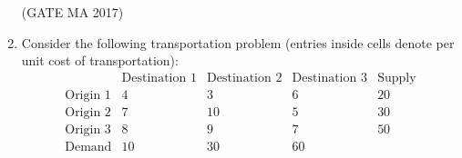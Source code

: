 \documentclass[journal,12pt,onecolumn]{IEEEtran}
\theoremstyle{remark}
\begin{document}
\begin{enumerate}
\begin{enumerate}
\end{enumerate}
\hfill (GATE MA 2017)
\item
Consider the following transportation problem (entries inside cells denote per unit cost of transportation):
$$
\begin{array}{c|ccc|c}
     & \text{Destination 1} & \text{Destination 2} & \text{Destination 3} & \text{Supply} \\
\hline
\text{Origin 1} & 4 & 3 & 6 & 20 \\
\text{Origin 2} & 7 & 10 & 5 & 30 \\
\text{Origin 3} & 8 & 9 & 7 & 50 \\
\hline
\text{Demand} & 10 & 30 & 60 & 
\end{array}
$$


\end{enumerate}
\end{document}
